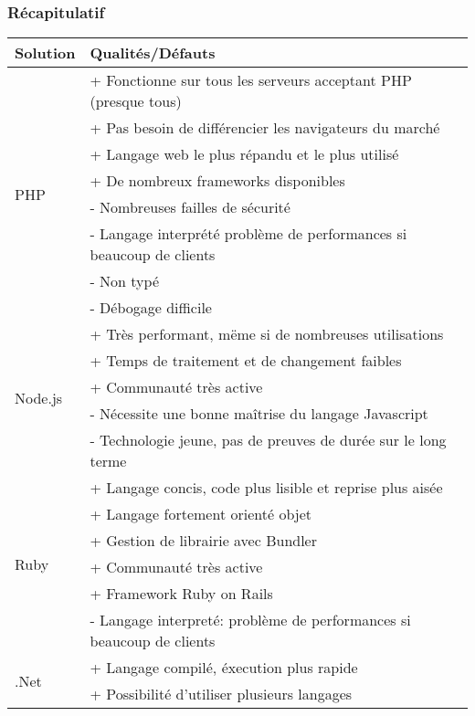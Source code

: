         \subsubsection{Récapitulatif}
        \label{recap}
        \begin{tabular}{|l|l|}
            \hline
            Solution & Qualités/Défauts \\ \hline
            \multirow{8}{*}{PHP} & + Fonctionne sur tous les serveurs acceptant PHP (presque tous) \\
                & + Pas besoin de différencier les navigateurs du marché \\
                & + Langage web le plus répandu et le plus utilisé \\
                & + De nombreux frameworks disponibles \\
                & - Nombreuses failles de sécurité \\
                & - Langage interprété problème de performances si beaucoup de clients \\
                & - Non typé \\
                & - Débogage difficile \\ \hline
            \multirow{5}{*}{Node.js} & + Très performant, mëme si de nombreuses utilisations \\
                & + Temps de traitement et de changement faibles \\
                & + Communauté très active \\
                & - Nécessite une bonne maîtrise du langage Javascript \\
                & - Technologie jeune, pas de preuves de durée sur le long terme \\ \hline
            \multirow{6}{*}{Ruby} & + Langage concis, code plus lisible et reprise plus aisée \\
                & + Langage fortement orienté objet \\
                & + Gestion de librairie avec Bundler \\
                & + Communauté très active \\
                & + Framework Ruby on Rails \\
                & - Langage interpreté: problème de performances si beaucoup de clients \\ \hline
            \multirow{6}{*}{.Net} & + Langage compilé, éxecution plus rapide \\
                & + Possibilité d'utiliser plusieurs langages \\

\end{tabular}
